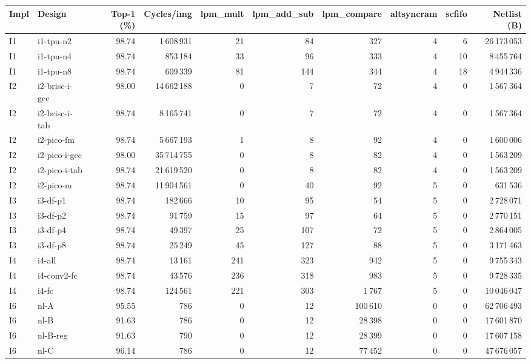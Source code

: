 \begin{table}[t]
\centering
\small
\begin{tabular}{llrrrrrrrr}
\toprule
Impl & Design & Top-1 (\%) & Cycles/img & lpm\_mult & lpm\_add\_sub & lpm\_compare & altsyncram & scfifo & Netlist (B) \\
\midrule
I1 & i1-tpu-n2 & 98.74 & 1\,608\,931 & 21 & 84 & 327 & 4 & 6 & 26\,173\,053 \\
I1 & i1-tpu-n4 & 98.74 & 853\,184 & 33 & 96 & 333 & 4 & 10 & 8\,455\,764 \\
I1 & i1-tpu-n8 & 98.74 & 609\,339 & 81 & 144 & 344 & 4 & 18 & 4\,944\,336 \\
\midrule
I2 & i2-brisc-i-gcc & 98.00 & 14\,662\,188 & 0 & 7 & 72 & 4 & 0 & 1\,567\,364 \\
I2 & i2-brisc-i-tab & 98.74 & 8\,165\,741 & 0 & 7 & 72 & 4 & 0 & 1\,567\,364 \\
I2 & i2-pico-fm & 98.74 & 5\,667\,193 & 1 & 8 & 92 & 4 & 0 & 1\,600\,006 \\
I2 & i2-pico-i-gcc & 98.00 & 35\,714\,755 & 0 & 8 & 82 & 4 & 0 & 1\,563\,209 \\
I2 & i2-pico-i-tab & 98.74 & 21\,619\,520 & 0 & 8 & 82 & 4 & 0 & 1\,563\,209 \\
I2 & i2-pico-m & 98.74 & 11\,904\,561 & 0 & 40 & 92 & 5 & 0 & 631\,536 \\
\midrule
I3 & i3-df-p1 & 98.74 & 182\,666 & 10 & 95 & 54 & 5 & 0 & 2\,728\,071 \\
I3 & i3-df-p2 & 98.74 & 91\,759 & 15 & 97 & 64 & 5 & 0 & 2\,770\,151 \\
I3 & i3-df-p4 & 98.74 & 49\,397 & 25 & 107 & 72 & 5 & 0 & 2\,864\,005 \\
I3 & i3-df-p8 & 98.74 & 25\,249 & 45 & 127 & 88 & 5 & 0 & 3\,171\,463 \\
\midrule
I4 & i4-all & 98.74 & 13\,161 & 241 & 323 & 942 & 5 & 0 & 9\,755\,343 \\
I4 & i4-conv2-fc & 98.74 & 43\,576 & 236 & 318 & 983 & 5 & 0 & 9\,728\,335 \\
I4 & i4-fc & 98.74 & 124\,561 & 221 & 303 & 1\,767 & 5 & 0 & 10\,046\,047 \\
\midrule
I6 & nl-A & 95.55 & 786 & 0 & 12 & 100\,610 & 0 & 0 & 62\,706\,493 \\
I6 & nl-B & 91.63 & 786 & 0 & 12 & 28\,398 & 0 & 0 & 17\,601\,870 \\
I6 & nl-B-reg & 91.63 & 790 & 0 & 12 & 28\,399 & 0 & 0 & 17\,607\,158 \\
I6 & nl-C & 96.14 & 786 & 0 & 12 & 77\,452 & 0 & 0 & 47\,676\,057 \\

\end{tabular}
\end{table}
